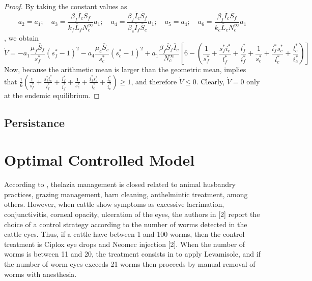 \documentclass[preprint, 12pt]{elsarticle}
\begin{document}
\begin{proof}
    \noindent By taking the constant values as
    $$
        a_2 = a_1; \quad
        a_3 =
            \frac{
                \beta_f \overline{I}_c
                \overline{S}_f
            }{
                k_f\overline{L}_f
                N_c^{\infty}
           } a_1; \quad
        a_4 =
        \frac{
            \beta_f
            \overline{I}_c
            \overline{S}_f
        }{
            \beta_c
            \overline{I}_f
            \overline{S}_c
        }
        a_1;
        \quad
        a_5=a_4;
        \quad
        a_6=\frac{\beta_f\overline{I}_c\overline{S}_f}{k_c\overline{L}_c
        N_c^{\infty}}a_1
    $$,
    we obtain
    $$
        \dot{V}=
        -a_1\frac{\mu_f\overline{S}_f}{s_f^*}
            \left(s_f^*-1\right)^2
            -a_4
            \frac{\mu_c\overline{S}_c}{s_c^*}
            \left(s_c^*-1\right)^2
            +
            a_1
            \frac{\beta_f\overline{S}_f\overline{I}_c}{N_c^{\infty}}
            \left[
                6-
                \left(
                    \frac{1}{s_f^*}+\frac{s_f^*i_c^*}{l_f^*}
                    +\frac{l_f^*}{i_f^*}+\frac{1}{s_c^*}
                    +\frac{i_f^*s_c^*}{l_c^*}+\frac{l_c^*}{i_c^*}
                \right)
            \right]
    $$
    Now, because the arithmetic mean is larger than the geometric mean, implies
    that
    $\frac{1}{6}\left(\frac{1}{s_f^*}+\frac{s_f^*i_c^*}{l_f^*}+\frac{l_f^*}{i_f^*}+\frac{1}{s_c^*}+\frac{i_f^*s_c^*}{l_c^*}+\frac{l_c^*}{i_c^*}\right)\geq
     1$, and therefore $\dot{V}\leq 0$. Clearly, $\dot{V} = 0$ only at the
    endemic equilibrium.

\end{proof}



\subsection{Persistance}

\section{Optimal Controlled Model}
        According to \cite{manjunath2016prevalence}, thelazia management is
    closed related to animal husbandry practices, grazing management, barn
    cleaning, anthelmintic treatment, among others. However, when cattle
    show symptoms as excessive lacrimation, conjunctivitis, corneal opacity,
    ulceration of the eyes, the authors in [2] report the
    choice of a control strategy according to the number of worms detected
    in the cattle eyes. Thus, if a cattle have between 1 and 100 worms, then
    the control treatment is Ciplox eye drops and Neomec injection [2].
    When the number of worms is between 11 and 20, the treatment consists in
    to apply Levamisole, and if the number of worm eyes exceeds 21 worms
    then proceeds by manual removal of worms with anesthesia.
\end{document}

